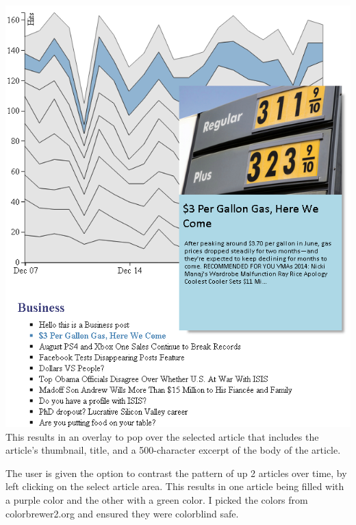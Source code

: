 \documentclass[12pt]{article}
\begin{document}
\noindent\includegraphics[scale=0.7]{img/viz_2} \\

This results in an overlay to pop over the selected article that includes the article's thumbnail, title, and a 500-character excerpt of the body of the article. 

The user is given the option to contrast the pattern of up 2 articles over time, by left clicking on the select article area. This results in one article being filled with a purple color and the other with a green color. I picked the colors from colorbrewer2.org and ensured they were colorblind safe.
\end{document}

